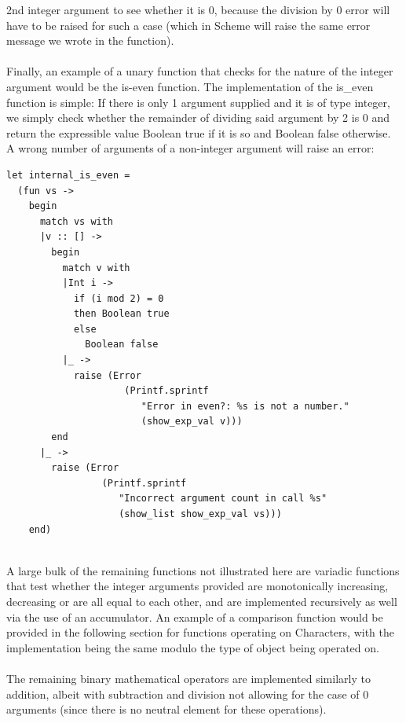 2nd integer argument to see whether it is 0, because the division by 0 error will have to be raised for such a case (which in Scheme will raise the same error message we wrote in the function).
\\
\\
Finally, an example of a unary function that checks for the nature of the integer argument would be the is-even function. The implementation of the is\_even function is simple: If there is only 1 argument supplied and it is of type 
integer, we simply check whether the remainder of dividing said argument by 2 is 0 and return the expressible value Boolean true if it is so and Boolean false otherwise. A wrong number of arguments of a non-integer argument 
will raise an error:
\begin{scriptsize}
\begin{verbatim}
let internal_is_even =
  (fun vs ->
    begin
      match vs with
      |v :: [] ->
        begin
          match v with
          |Int i ->
            if (i mod 2) = 0
            then Boolean true
            else
              Boolean false
          |_ ->
            raise (Error
                     (Printf.sprintf
                        "Error in even?: %s is not a number."
                        (show_exp_val v)))
        end
      |_ ->
        raise (Error
                 (Printf.sprintf
                    "Incorrect argument count in call %s"
                    (show_list show_exp_val vs)))
    end)
\end{verbatim}
\end{scriptsize}
\\
A large bulk of the remaining functions not illustrated here are variadic functions that test whether the integer arguments provided are monotonically increasing, decreasing or are all equal to each other, and are 
implemented recursively as well via the use of an accumulator. An example of a comparison function would be provided in the following section for functions operating on Characters, with the implementation being the 
same modulo the type of object being operated on. 
\\
\\
The remaining binary mathematical operators are implemented similarly to addition, albeit with subtraction and division not allowing for the case of 0 arguments (since there is no neutral element for these operations).
